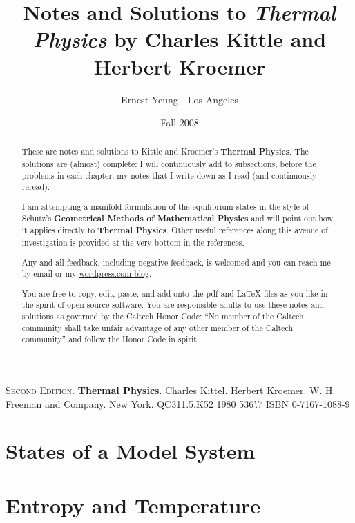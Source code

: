 \documentclass[twoside]{amsart}
\title{Notes and Solutions to \emph{ Thermal Physics } by Charles Kittle and Herbert Kroemer }
\author{
  Ernest Yeung - Los Angeles
       }
\date{Fall 2008}
\theoremstyle{plain}
\theoremstyle{definition}
\begin{document}


\begin{abstract}
These are notes and solutions to Kittle and Kroemer's \textbf{Thermal Physics}.  The solutions are (almost) complete: I will continuously add to subsections, before the problems in each chapter, my notes that I write down as I read (and continuously reread).  

I am attempting a manifold formulation of the equilibrium states in the style of Schutz's \textbf{Geometrical Methods of Mathematical Physics} and will point out how it applies directly to \textbf{Thermal Physics}.  Other useful references along this avenue of investigation is provided at the very bottom in the references.  

Any and all feedback, including negative feedback, is welcomed and you can reach me by email or my \href{http://ernestyalumni.wordpress.com}{wordpress.com blog}.  

You are free to copy, edit, paste, and add onto the pdf and LaTeX files as you like in the spirit of open-source software.  You are responsible adults to use these notes and solutions as governed by the Caltech Honor Code: ``No member of the Caltech community shall take unfair advantage of any other member of the Caltech community'' and follow the Honor Code in spirit.   

\end{abstract}


\maketitle

\textsc{Second Edition}.  \textbf{Thermal Physics}.  Charles Kittel.  Herbert Kroemer.  W. H. Freeman and Company.  New York.  QC311.5.K52 1980  536'.7  ISBN 0-7167-1088-9

\section{States of a Model System}

\section{Entropy and Temperature}
\end{document}
